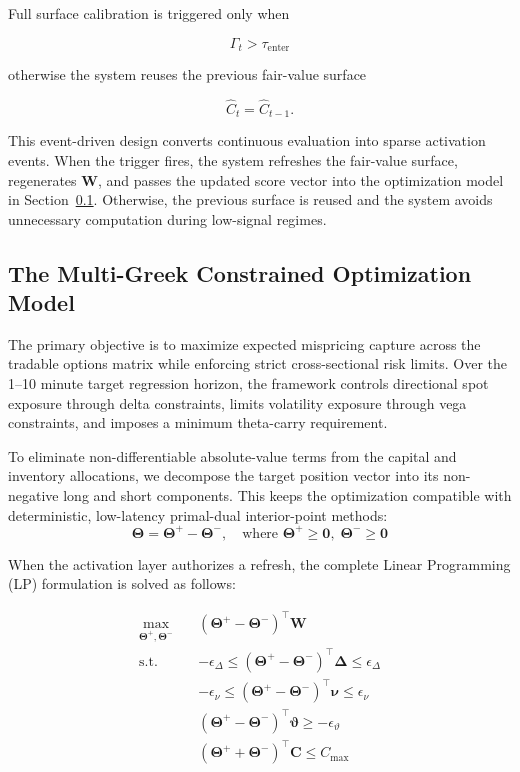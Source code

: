 \documentclass[11pt, a4paper]{article}
\begin{document}
Full surface calibration is triggered only when

\begin{equation}
\Gamma_t
>
\tau_{\mathrm{enter}}
\end{equation}

otherwise the system reuses the previous fair-value surface

\[
\widehat{C}_{t}
=
\widehat{C}_{t-1}.
\]

This event-driven design converts continuous evaluation into sparse activation events. When the trigger fires, the system refreshes the fair-value surface, regenerates $\mathbf{W}$, and passes the updated score vector into the optimization model in Section~\ref{subsec:optimization-model}. Otherwise, the previous surface is reused and the system avoids unnecessary computation during low-signal regimes.

\subsection{The Multi-Greek Constrained Optimization Model}
\label{subsec:optimization-model}
The primary objective is to maximize expected mispricing capture across the tradable options matrix while enforcing strict cross-sectional risk limits. Over the 1--10 minute target regression horizon, the framework controls directional spot exposure through delta constraints, limits volatility exposure through vega constraints, and imposes a minimum theta-carry requirement.

To eliminate non-differentiable absolute-value terms from the capital and inventory allocations, we decompose the target position vector into its non-negative long and short components. This keeps the optimization compatible with deterministic, low-latency primal-dual interior-point methods:
\begin{equation}
\boldsymbol{\Theta} = \boldsymbol{\Theta}^+ - \boldsymbol{\Theta}^-, \quad \text{where } \boldsymbol{\Theta}^+ \ge \mathbf{0}, \; \boldsymbol{\Theta}^- \ge \mathbf{0}
\end{equation}

When the activation layer authorizes a refresh, the complete Linear Programming (LP) formulation is solved as follows:

\begin{align}
\max_{\boldsymbol{\Theta}^+, \boldsymbol{\Theta}^-} \quad & (\boldsymbol{\Theta}^+ - \boldsymbol{\Theta}^-)^\top \mathbf{W} \label{eq:objective} \\
\text{s.t.} \quad & -\epsilon_{\Delta} \le (\boldsymbol{\Theta}^+ - \boldsymbol{\Theta}^-)^\top \boldsymbol{\Delta} \le \epsilon_{\Delta} \label{eq:delta_const} \\
& -\epsilon_{\nu} \le (\boldsymbol{\Theta}^+ - \boldsymbol{\Theta}^-)^\top \boldsymbol{\nu} \le \epsilon_{\nu} \label{eq:vega_const} \\
& (\boldsymbol{\Theta}^+ - \boldsymbol{\Theta}^-)^\top \boldsymbol{\vartheta} \ge -\epsilon_{\vartheta} \label{eq:theta_const} \\
& (\boldsymbol{\Theta}^+ + \boldsymbol{\Theta}^-)^\top \mathbf{C} \le C_{\max} \label{eq:capital_const}
\end{align}
\end{document}
